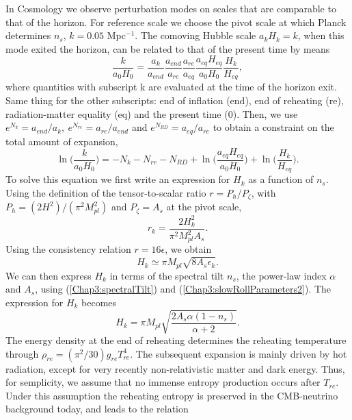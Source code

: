 \documentclass[11pt,a4paper,twoside]{book}
\begin{document}
In Cosmology we observe perturbation modes on scales that are comparable to that of the horizon. For reference scale we choose the pivot scale at which Planck determines $ n_{s} $, $ k=0.05 $ Mpc$ ^{-1} $. The comoving Hubble scale $ a_{k}H_{k}=k $, when this mode exited the horizon, can be related to that of the present time by means
\begin{equation}
\label{Chap3:relationBetweenScales}
\frac{k}{a_{0}H_{0}} = \frac{a_{k}}{a_{end}}\frac{a_{end}}{a_{re}}\frac{a_{re}}{a_{eq}}\frac{a_{eq}H_{eq}}{a_{0}H_{0}}\frac{H_{k}}{H_{eq}},
\end{equation} 
where quantities with subscript k are evaluated at the time of the horizon exit. Same thing for the other subscripts: end of inflation (end), end of reheating (re), radiation-matter equality (eq) and the present time (0). Then, we use $ e^{N_{k}}=a_{end}/a_{k},\ e^{N_{re}}=a_{re}/a_{end}  $ and $ e^{N_{RD}}=a_{eq}/a_{re} $ to obtain a constraint on the total amount of expansion,
\begin{equation}
	\label{Chap3:relationBetweenScales2}
	\ln \Bigg(\frac{k}{a_{0}H_{0}}\Bigg) = -N_{k} - N_{re} - N_{RD} + \ln \Bigg(\frac{a_{eq}H_{eq}}{a_{0}H_{0}}\Bigg) + \ln \Bigg(\frac{H_{k}}{H_{eq}}\Bigg).   
\end{equation}
To solve this equation we first  write an expression for $ H_{k} $ as a function of $ n_{s} $. Using the definition of the tensor-to-scalar ratio $ r= P_{h}/P_{\zeta} $, with $ P_{h}=(2H^{2})/(\pi^{2}M_{pl}^{2}) $ and $ P_{\zeta} = A_{s} $ at the pivot scale, 
\begin{equation}
\label{chap3:tensortToScalarRatio}
r_{k}=\frac{2H^{2}_{k}}{\pi^{2}M_{pl}^{2}A_{s}}.
\end{equation}
Using the consistency relation $ r=16\epsilon $, we obtain
\begin{equation}
	H_{k}\simeq \pi M_{pl}\sqrt{8A_{s}\epsilon_{k}}.
\end{equation}
We can then express $ H_{k} $ in terms of the spectral tilt $ n_{s} $, the power-law index $\alpha$ and $ A_{s} $, using (\ref{Chap3:spectralTilt}) and (\ref{Chap3:slowRollParameters2}). The expression for $ H_{k} $ becomes
\begin{equation}
	\label{chap3:expressionHk}
	H_{k}=\pi M_{pl}\sqrt{\frac{2A_{s}\alpha (1-n_{s})}{\alpha +2}}.
\end{equation}
The energy density at the end of reheating determines the reheating temperature through $\rho_{re}=(\pi^{2}/30)g_{re}T^{4}_{re}$. The subsequent expansion is mainly driven by hot radiation, except for very recently non-relativistic matter and dark energy. Thus, for semplicity, we assume that no immense entropy production occurs after $ T_{re} $. Under this assumption the reheating entropy is preserved in the CMB-neutrino background today, and leads to the relation
\end{document}
